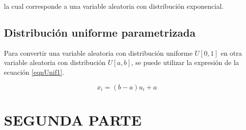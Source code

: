\documentclass{sig-alternate}
\begin{document}
la cual corresponde a una variable aleatoria con distribuci\'on exponencial.

\subsection{Distribuci\'on uniforme parametrizada}
\label{uniformeParamSec}

Para convertir una variable aleatoria con distribuci\'on uniforme $U[0,1]$ en otra variable aleatoria con distribuci\'on $U[a, b]$, se puede utilizar la expresi\'on de la ecuaci\'on \ref{eqnUnif1}.

\begin{equation}
\label{eqnUnif1}
 x_i = (b-a)u_i + a
\end{equation}

\section{SEGUNDA PARTE}
\end{document}
